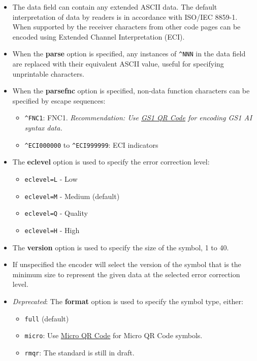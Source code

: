 \begin{itemize}
\tightlist
\item
  The data field can contain any extended ASCII data. The default
  interpretation of data by readers is in accordance with ISO/IEC
  8859-1. When supported by the receiver characters from other code
  pages can be encoded using Extended Channel Interpretation (ECI).
\item
  When the \textbf{parse} option is specified, any instances of
  \texttt{\^{}NNN} in the data field are replaced with their equivalent
  ASCII value, useful for specifying unprintable characters.
\item
  When the \textbf{parsefnc} option is specified, non-data function
  characters can be specified by escape sequences:

  \begin{itemize}
  \tightlist
  \item
    \texttt{\^{}FNC1}: FNC1. \emph{Recommendation: Use
    \protect\hyperlink{gs1-qr-code}{GS1 QR Code} for encoding GS1 AI
    syntax data.}
  \item
    \texttt{\^{}ECI000000} to \texttt{\^{}ECI999999}: ECI indicators
  \end{itemize}
\item
  The \textbf{eclevel} option is used to specify the error correction
  level:

  \begin{itemize}
  \tightlist
  \item
    \texttt{eclevel=L} - Low
  \item
    \texttt{eclevel=M} - Medium (default)
  \item
    \texttt{eclevel=Q} - Quality
  \item
    \texttt{eclevel=H} - High
  \end{itemize}
\item
  The \textbf{version} option is used to specify the size of the symbol,
  1 to 40.
\item
  If unspecified the encoder will select the version of the symbol that
  is the minimum size to represent the given data at the selected error
  correction level.
\item
  \emph{Deprecated}: The \textbf{format} option is used to specify the
  symbol type, either:

  \begin{itemize}
  \tightlist
  \item
    \texttt{full} (default)
  \item
    \texttt{micro}: Use \protect\hyperlink{micro-qr-code}{Micro QR Code}
    for Micro QR Code symbols.
  \item
    \texttt{rmqr}: The standard is still in draft.
  \end{itemize}
\end{itemize}


